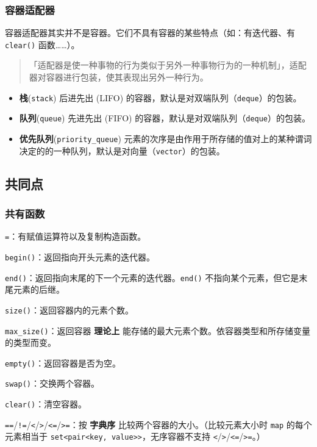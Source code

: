\subsubsection{容器适配器}\label{ux5bb9ux5668ux9002ux914dux5668}

容器适配器其实并不是容器。它们不具有容器的某些特点（如：有迭代器、有 \texttt{clear()} 函数\ldots\ldots）。

\begin{quote}
「适配器是使一种事物的行为类似于另外一种事物行为的一种机制」，适配器对容器进行包装，使其表现出另外一种行为。
\end{quote}

\begin{itemize}
\tightlist
\item
  \textbf{栈}(\texttt{stack}) 后进先出 (LIFO) 的容器，默认是对双端队列（\texttt{deque}）的包装。
\item
  \textbf{队列}(\texttt{queue}) 先进先出 (FIFO) 的容器，默认是对双端队列（\texttt{deque}）的包装。
\item
  \textbf{优先队列}(\texttt{priority\_queue}) 元素的次序是由作用于所存储的值对上的某种谓词决定的的一种队列，默认是对向量（\texttt{vector}）的包装。
\end{itemize}

\subsection{共同点}\label{ux5171ux540cux70b9}

\subsubsection{共有函数}\label{ux5171ux6709ux51fdux6570}

\texttt{=}：有赋值运算符以及复制构造函数。

\texttt{begin()}：返回指向开头元素的迭代器。

\texttt{end()}：返回指向末尾的下一个元素的迭代器。\texttt{end()} 不指向某个元素，但它是末尾元素的后继。

\texttt{size()}：返回容器内的元素个数。

\texttt{max\_size()}：返回容器 \textbf{理论上} 能存储的最大元素个数。依容器类型和所存储变量的类型而变。

\texttt{empty()}：返回容器是否为空。

\texttt{swap()}：交换两个容器。

\texttt{clear()}：清空容器。

\texttt{==}/\texttt{!=}/\texttt{\textless{}}/\texttt{\textgreater{}}/\texttt{\textless{}=}/\texttt{\textgreater{}=}：按 \textbf{字典序} 比较两个容器的大小。（比较元素大小时 \texttt{map} 的每个元素相当于 \texttt{set\textless{}pair\textless{}key,\ value\textgreater{}\textgreater{}}，无序容器不支持 \texttt{\textless{}}/\texttt{\textgreater{}}/\texttt{\textless{}=}/\texttt{\textgreater{}=}。）

